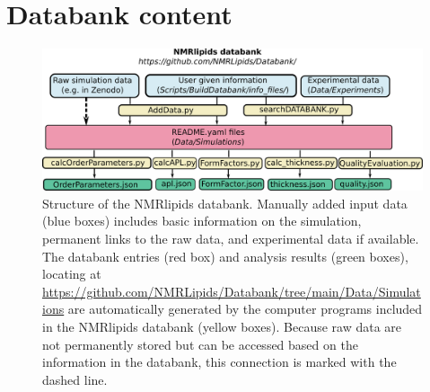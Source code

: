 \documentclass[fleqn,10pt]{wlscirep}
\begin{document}
\pagebreak
\section{Databank content}


\begin{figure}[!h]
  \includegraphics[width=\textwidth]{Figures/DataBankChart.pdf}
  \caption{Structure of the NMRlipids databank. Manually added input data (blue boxes) includes basic information on the simulation, permanent links to the raw data, and experimental data if available. The databank entries (red box) and analysis results (green boxes), locating at \url{https://github.com/NMRLipids/Databank/tree/main/Data/Simulations} are automatically generated by the computer programs included in the NMRlipids databank (yellow boxes). Because raw data are not permanently stored but can be accessed based on the information in the databank, this connection is marked with the dashed line.}
  \label{DatabankStructure}
\end{figure}
\end{document}
